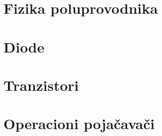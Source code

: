 \section{Fizika poluprovodnika}

\section{Diode}

\section{Tranzistori}

\section{Operacioni poja\v cava\v ci}